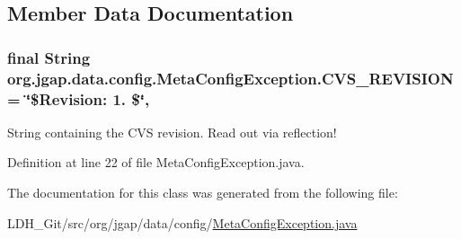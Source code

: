 \subsection{Member Data Documentation}
\hypertarget{classorg_1_1jgap_1_1data_1_1config_1_1_meta_config_exception_a8d42e79f14258d394cf0cb11ce51f534}{
\subsubsection[{C\-V\-S\-\_\-\-R\-E\-V\-I\-S\-I\-O\-N}]{\setlength{\rightskip}{0pt plus 5cm}final String org.\-jgap.\-data.\-config.\-Meta\-Config\-Exception.\-C\-V\-S\-\_\-\-R\-E\-V\-I\-S\-I\-O\-N = \char`\"{}\$Revision\-: 1. \$\char`\"{}\hspace{0.3cm}{\ttfamily [static]}, {\ttfamily [private]}}}\label{classorg_1_1jgap_1_1data_1_1config_1_1_meta_config_exception_a8d42e79f14258d394cf0cb11ce51f534}
String containing the C\-V\-S revision. Read out via reflection! 

Definition at line 22 of file Meta\-Config\-Exception.\-java.



The documentation for this class was generated from the following file\-:\begin{DoxyCompactItemize}
\item 
L\-D\-H\-\_\-\-Git/src/org/jgap/data/config/\hyperlink{_meta_config_exception_8java}{Meta\-Config\-Exception.\-java}\end{DoxyCompactItemize}
